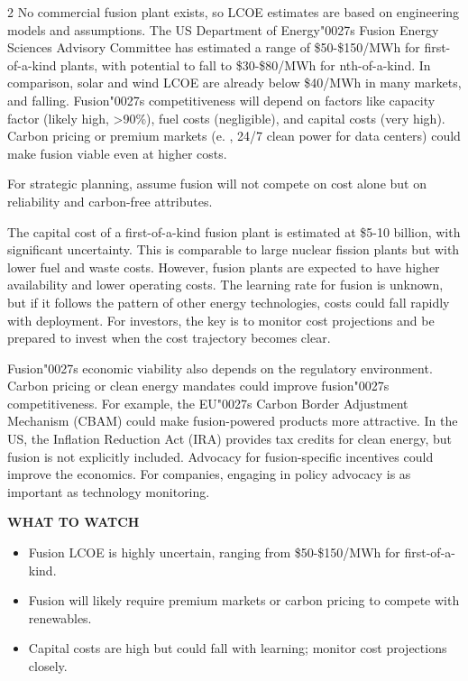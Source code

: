 \documentclass[10pt,a4paper]{article}
\begin{document}
\begin{multicols}{2}
{\small No commercial fusion plant exists, so LCOE estimates are based on engineering models and assumptions. The US Department of Energy\char"0027{}s Fusion Energy Sciences Advisory Committee has estimated a range of \$50-\$150/MWh for first-of-a-kind plants, with potential to fall to \$30-\$80/MWh for nth-of-a-kind. In comparison, solar and wind LCOE are already below \$40/MWh in many markets, and falling. Fusion\char"0027{}s competitiveness will depend on factors like capacity factor (likely high, >90\%), fuel costs (negligible), and capital costs (very high). Carbon pricing or premium markets (e. , 24/7 clean power for data centers) could make fusion viable even at higher costs.}\par
{\small For strategic planning, assume fusion will not compete on cost alone but on reliability and carbon-free attributes.}\par
{\small The capital cost of a first-of-a-kind fusion plant is estimated at \$5-10 billion, with significant uncertainty. This is comparable to large nuclear fission plants but with lower fuel and waste costs. However, fusion plants are expected to have higher availability and lower operating costs. The learning rate for fusion is unknown, but if it follows the pattern of other energy technologies, costs could fall rapidly with deployment. For investors, the key is to monitor cost projections and be prepared to invest when the cost trajectory becomes clear.}\par
{\small Fusion\char"0027{}s economic viability also depends on the regulatory environment. Carbon pricing or clean energy mandates could improve fusion\char"0027{}s competitiveness. For example, the EU\char"0027{}s Carbon Border Adjustment Mechanism (CBAM) could make fusion-powered products more attractive. In the US, the Inflation Reduction Act (IRA) provides tax credits for clean energy, but fusion is not explicitly included. Advocacy for fusion-specific incentives could improve the economics. For companies, engaging in policy advocacy is as important as technology monitoring.}\par
\end{multicols}
\vspace{4pt}\noindent\begin{minipage}{\linewidth}
{\textcolor{BOGreen}{\scriptsize\bfseries WHAT TO WATCH}}\par\vspace{2pt}
{\footnotesize\begin{itemize}
\item Fusion LCOE is highly uncertain, ranging from \$50-\$150/MWh for first-of-a-kind.
\item Fusion will likely require premium markets or carbon pricing to compete with renewables.
\item Capital costs are high but could fall with learning; monitor cost projections closely.
\end{itemize}}
\end{minipage}
\label{chap:3:end}
\end{document}
